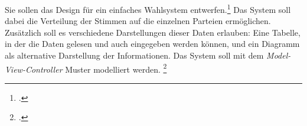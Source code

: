 \documentclass{bschlangaul-aufgabe}
\begin{document}

Sie sollen das Design für ein einfaches Wahlsystem
entwerfen.\footcite{examen:66116:2014:09} Das System soll dabei die
Verteilung der Stimmen auf die einzelnen Parteien ermöglichen.
Zusätzlich soll es verschiedene Darstellungen dieser Daten erlauben:
Eine Tabelle, in der die Daten gelesen und auch eingegeben werden
können, und ein Diagramm als alternative Darstellung der Informationen.
Das System soll mit dem \emph{Model-View-Controller} Muster modelliert
werden.
\footcite[StEx H14, T2, TA2, A2 (geänderte Aufgabenstellung), Aufgabe 4]{sosy:ab:6}
\end{document}
